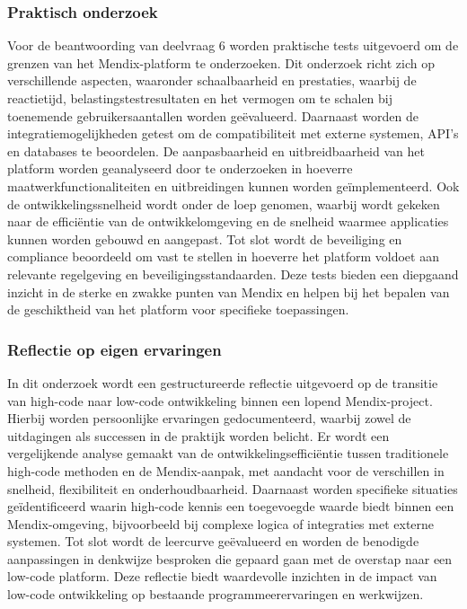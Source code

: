 \subsubsection{Praktisch onderzoek}
Voor de beantwoording van deelvraag 6 worden praktische tests uitgevoerd om de grenzen van het Mendix-platform te onderzoeken. Dit onderzoek richt zich op verschillende aspecten, waaronder schaalbaarheid en prestaties, waarbij de reactietijd, belastingstestresultaten en het vermogen om te schalen bij toenemende gebruikersaantallen worden geëvalueerd. Daarnaast worden de integratiemogelijkheden getest om de compatibiliteit met externe systemen, API’s en databases te beoordelen. De aanpasbaarheid en uitbreidbaarheid van het platform worden geanalyseerd door te onderzoeken in hoeverre maatwerkfunctionaliteiten en uitbreidingen kunnen worden geïmplementeerd. Ook de ontwikkelingssnelheid wordt onder de loep genomen, waarbij wordt gekeken naar de efficiëntie van de ontwikkelomgeving en de snelheid waarmee applicaties kunnen worden gebouwd en aangepast. Tot slot wordt de beveiliging en compliance beoordeeld om vast te stellen in hoeverre het platform voldoet aan relevante regelgeving en beveiligingsstandaarden. Deze tests bieden een diepgaand inzicht in de sterke en zwakke punten van Mendix en helpen bij het bepalen van de geschiktheid van het platform voor specifieke toepassingen.

\subsubsection{Reflectie op eigen ervaringen}
In dit onderzoek wordt een gestructureerde reflectie uitgevoerd op de transitie van high-code naar low-code ontwikkeling binnen een lopend Mendix-project. Hierbij worden persoonlijke ervaringen gedocumenteerd, waarbij zowel de uitdagingen als successen in de praktijk worden belicht. Er wordt een vergelijkende analyse gemaakt van de ontwikkelingsefficiëntie tussen traditionele high-code methoden en de Mendix-aanpak, met aandacht voor de verschillen in snelheid, flexibiliteit en onderhoudbaarheid. Daarnaast worden specifieke situaties geïdentificeerd waarin high-code kennis een toegevoegde waarde biedt binnen een Mendix-omgeving, bijvoorbeeld bij complexe logica of integraties met externe systemen. Tot slot wordt de leercurve geëvalueerd en worden de benodigde aanpassingen in denkwijze besproken die gepaard gaan met de overstap naar een low-code platform. Deze reflectie biedt waardevolle inzichten in de impact van low-code ontwikkeling op bestaande programmeerervaringen en werkwijzen.

